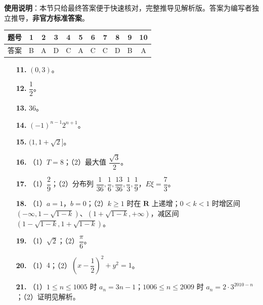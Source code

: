 
\begin{gknotice}
\textbf{使用说明}：本节只给最终答案便于快速核对，完整推导见解析版。答案为编写者独立推导，\textbf{非官方标准答案}。
\end{gknotice}

\begin{center}\begin{tabular}{ccccccccccc}
\toprule
题号 & 1 & 2 & 3 & 4 & 5 & 6 & 7 & 8 & 9 & 10 \\
\midrule
答案 & B & A & D & C & A & C & C & D & B & A \\
\bottomrule
\end{tabular}\end{center}

\begin{itemize}[leftmargin=2.6em]
  \item[\textbf{11.}] $(0,3)$。
  \item[\textbf{12.}] $\dfrac12$。
  \item[\textbf{13.}] $36$。
  \item[\textbf{14.}] $(-1)^{n-1}2^{n+1}$。
  \item[\textbf{15.}] $(1,1+\sqrt2]$。
\end{itemize}

\begin{itemize}[leftmargin=2.6em]
  \item[\textbf{16.}] （1）$T=8$；（2）最大值 $\dfrac{\sqrt3}2$。
  \item[\textbf{17.}] （1）$\dfrac29$；（2）分布列 $\dfrac1{36},\dfrac16,\dfrac{13}{36},\dfrac13,\dfrac19$，$E\xi=\dfrac73$。
  \item[\textbf{18.}] （1）$a=1$，$b=0$；（2）$k\geqslant1$ 时在 $\mathbf R$ 上递增；$0<k<1$ 时增区间 $(-\infty,1-\sqrt{1-k})$、$(1+\sqrt{1-k},+\infty)$，减区间 $(1-\sqrt{1-k},1+\sqrt{1-k})$。
  \item[\textbf{19.}] （1）$\sqrt2$；（2）$\dfrac\pi6$。
  \item[\textbf{20.}] （1）$4$；（2）$\left(x-\dfrac12\right)^2+y^2=1$。
  \item[\textbf{21.}] （1）$1\leqslant n\leqslant1005$ 时 $a_n=3n-1$；$1006\leqslant n\leqslant2009$ 时 $a_n=2\cdot3^{2010-n}$；（2）证明见解析。
\end{itemize}

